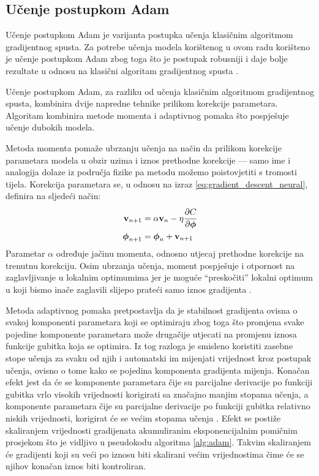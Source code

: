 \documentclass[times, utf8, diplomski, numeric]{fer}
\begin{document}
\subsection{Učenje postupkom Adam}
Učenje postupkom Adam je varijanta postupka učenja klasičnim algoritmom gradijentnog spusta.
Za potrebe učenja modela korištenog u ovom radu korišteno je učenje postupkom Adam zbog toga što je postupak robusniji i daje bolje rezultate u odnosu na klasični algoritam gradijentnog spusta \citep{article:adam}. 

Učenje postupkom Adam, za razliku od učenja klasičnim algoritmom gradijentnog spusta, kombinira dvije napredne tehnike prilikom korekcije parametara. 
Algoritam kombinira metode momenta i adaptivnog pomaka što pospješuje učenje dubokih modela.

Metoda momenta pomaže ubrzanju učenja na način da prilikom korekcije parametara modela u obzir uzima i iznos prethodne korekcije --- samo ime i analogija dolaze iz područja fizike pa metodu možemo poistovjetiti s tromosti tijela.
Korekcija parametara se, u odnosu na izraz \ref{eq:gradient_descent_neural}, definira na sljedeći način:
\begin{align}
\mathbf{v}_{n+1} &= \alpha \mathbf{v}_{n} - \eta \cfrac{\partial C}{\partial \boldsymbol{\phi}} \\
 \boldsymbol{\phi}_{n+1} &= \boldsymbol{\phi}_n + \mathbf{v}_{n+1}
\end{align} 
Parametar $\alpha$ određuje jačinu momenta, odnosno utjecaj prethodne korekcije na trenutnu korekciju.
Osim ubrzanja učenja, moment pospješuje i otpornost na zaglavljivanje u lokalnim optimumima jer je moguće ``preskočiti'' lokalni optimum u koji bismo inače zaglavili slijepo prateći samo iznos gradijenta \citep{book:deeplearningbook} \citep{seminar:rela}.

Metoda adaptivnog pomaka pretpostavlja da je stabilnost gradijenta ovisna o svakoj komponenti parametara koji se optimiraju zbog toga što promjena svake pojedine komponente parametara može drugačije utjecati na promjenu iznosa funkcije gubitka koja se optimira.
Iz tog razloga je smisleno koristiti zasebne stope učenja za svaku od njih i automatski im mijenjati vrijednost kroz postupak učenja, ovisno o tome kako se pojedina komponenta gradijenta mijenja.
Konačan efekt jest da će se komponente parametara čije su parcijalne derivacije po funkciji gubitka vrlo visokih vrijednosti korigirati sa značajno manjim stopama učenja, a komponente parametara čije su parcijalne derivacije po funkciji gubitka relativno niskih vrijednosti, korigirat će se većim stopama učenja \citep{book:deeplearningbook} \citep{seminar:rela}.
Efekt se postiže skaliranjem vrijednosti gradijenata akumuliranim eksponencijalnim pomičnim prosjekom  što je vidljivo u pseudokodu algoritma \ref{alg:adam}. 
Takvim skaliranjem će gradijenti koji su veći po iznosu biti skalirani većim vrijednostima čime će se njihov konačan iznos biti kontroliran.
\end{document}
